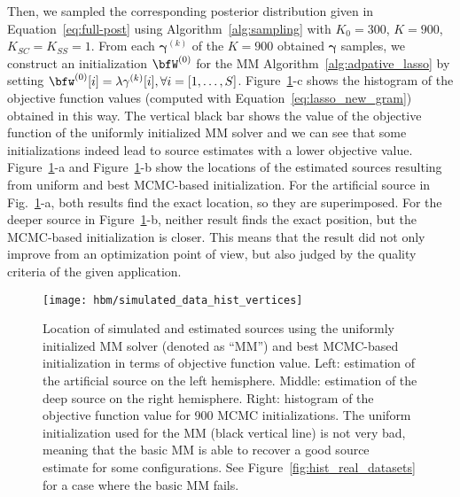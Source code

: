 Then, we sampled the corresponding posterior distribution given in Equation~\eqref{eq:full-post} using Algorithm~\ref{alg:sampling} with $K_0 = 300$, $K = 900$, $K_{SC} = K_{SS} = 1$. From each $\mathbf{\gamma}^{(k)}$ of the $K = 900$ obtained $\mathbf{\gamma}$ samples, we construct an initialization $\bfW^{(0)}$ for the MM Algorithm~\ref{alg:adpative_lasso} by setting $\bfw^{(0)}[i] = \lambda \mathbf{\gamma}^{(k)}[i], \forall i=[1,\dots,S]$. Figure~\ref{fig:simu_MM_best_MCMC}-c shows the histogram of the objective function values (computed with Equation~\eqref{eq:lasso_new_gram}) obtained in this way. The vertical black bar shows the value of the objective function of the uniformly initialized MM solver and we can see that some initializations indeed lead to source estimates with a lower objective value. Figure~\ref{fig:simu_MM_best_MCMC}-a and Figure~\ref{fig:simu_MM_best_MCMC}-b show the locations of the estimated sources resulting from uniform and best MCMC-based initialization. For the artificial source in Fig.~\ref{fig:simu_MM_best_MCMC}-a, both results find the exact location, so they are superimposed. For the deeper source in Figure~\ref{fig:simu_MM_best_MCMC}-b, neither result finds the exact position, but the MCMC-based initialization is closer. This means that the result did not only improve from an optimization point of view, but also judged by the quality criteria of the given application.

\begin{figure}[htp]
	\centering
	\texttt{[image: hbm/simulated\_data\_hist\_vertices]}
	\caption{Location of simulated and estimated sources using the uniformly initialized MM solver (denoted as ``MM'') and best MCMC-based initialization in terms of objective function value. Left: estimation of the artificial source on the left hemisphere. Middle: estimation of the deep source on the right hemisphere. Right: histogram of the objective function value for 900 MCMC initializations. The uniform initialization used for the MM (black vertical line) is not very bad, meaning that the basic MM is able to recover a good source estimate for some configurations. See Figure~\ref{fig:hist_real_datasets} for a case where the basic MM fails.}
	\label{fig:simu_MM_best_MCMC}
\end{figure}

